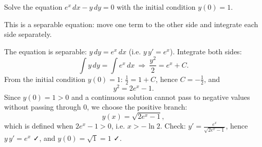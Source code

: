 
\begin{question}
Solve the equation $e^x\,dx-y\,dy=0$ with the initial condition $y(0)=1$.
\end{question}

\begin{hint}
This is a separable equation: move one term to the other side and integrate each side separately.
\end{hint}

\begin{solution}
The equation is separable: $y\,dy=e^x\,dx$ (i.e. $y\,y'=e^x$). Integrate both sides:
\[ \int y\,dy=\int e^x\,dx\ \Longrightarrow\ \frac{y^2}{2}=e^x+C. \]
From the initial condition $y(0)=1$: $\frac12=1+C$, hence $C=-\frac12$, and
\[ y^2=2e^x-1. \]
Since $y(0)=1>0$ and a continuous solution cannot pass to negative values without passing through $0$, we choose the positive branch:
\[ y(x)=\sqrt{2e^x-1}, \]
which is defined when $2e^x-1>0$, i.e. $x>-\ln 2$.
Check: $y'=\frac{e^x}{\sqrt{2e^x-1}}$, hence $y\,y'=e^x$ ✓, and $y(0)=\sqrt{1}=1$ ✓.
\end{solution}
